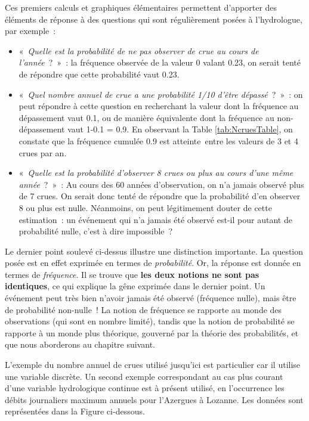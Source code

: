 \documentclass[
]{book}
\providecommand{\tightlist}{%
  \setlength{\itemsep}{0pt}\setlength{\parskip}{0pt}}
\begin{document}
Ces premiers calculs et graphiques élémentaires permettent d'apporter des éléments de réponse à des questions qui sont régulièrement posées à l'hydrologue, par exemple~:

\begin{itemize}
\tightlist
\item
  «~\emph{Quelle est la probabilité de ne pas observer de crue au cours de l'année}~?~»~: la fréquence observée de la valeur 0 valant 0.23, on serait tenté de répondre que cette probabilité vaut 0.23.
\item
  «~\emph{Quel nombre annuel de crue a une probabilité 1/10 d'être dépassé}~?~»~: on peut répondre à cette question en recherchant la valeur dont la fréquence au dépassement vaut 0.1, ou de manière équivalente dont la fréquence au non-dépassement vaut 1-0.1 = 0.9. En observant la Table \ref{tab:NcruesTable}, on constate que la fréquence cumulée 0.9 est atteinte~entre les valeurs de 3 et 4 crues par an.
\item
  «~\emph{Quelle est la probabilité d'observer 8 crues ou plus au cours d'une même année}~?~»~: Au cours des 60 années d'observation, on n'a jamais observé plus de 7 crues. On serait donc tenté de répondre que la probabilité d'en observer 8 ou plus est nulle. Néanmoins, on peut légitimement douter de cette estimation~: un événement qui n'a jamais été observé est-il pour autant de probabilité nulle, c'est à dire impossible~?
\end{itemize}

Le dernier point soulevé ci-dessus illustre une distinction importante. La question posée est en effet exprimée en termes de \emph{probabilité}. Or, la réponse est donnée en termes de \emph{fréquence}. Il se trouve que \textbf{les deux notions ne sont pas identiques}, ce qui explique la gêne exprimée dans le dernier point. Un événement peut très bien n'avoir jamais été observé (fréquence nulle), mais être de probabilité non-nulle~! La notion de fréquence se rapporte au monde des observations (qui sont en nombre limité), tandis que la notion de probabilité se rapporte à un monde plus théorique, gouverné par la théorie des probabilités, et que nous aborderons au chapitre suivant.

L'exemple du nombre annuel de crues utilisé jusqu'ici est particulier car il utilise une variable discrète. Un second exemple correspondant au cas plus courant d'une variable hydrologique continue est à présent utilisé, en l'occurrence les débits journaliers maximum annuels pour l'Azergues à Lozanne. Les données sont représentées dans la Figure ci-dessous.
\end{document}
